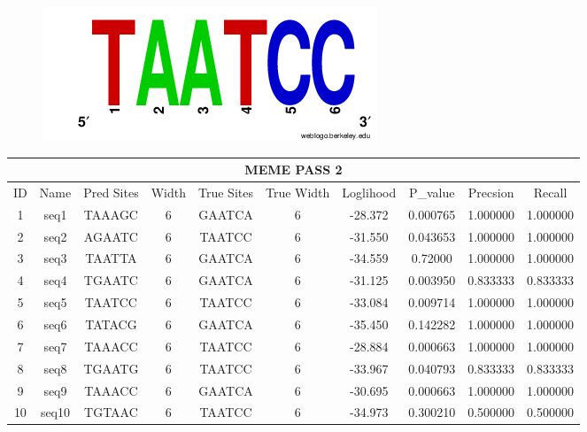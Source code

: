 \documentclass{article}
\begin{document}
\begin{table}
\begin{tabular}{cccccccccc}
\bottomrule
\end{tabular}
\begin{figure}[H]
\centering
\includegraphics[scale=0.25]{test1.png}
\label{fig:svd}
\end{figure}
\centering
\begin{tabular}{cccccccccc}
  \multicolumn{10}{|c|}{\textbf{MEME PASS 2}}\\
   \hline
\toprule
 ID &   Name & Pred Sites & Width & True Sites & True Width &  Loglihood &   P\_value &  Precsion &    Recall \\
\midrule
  1 &   seq1 &     TAAAGC &     6 &     GAATCA &          6 &    -28.372 &  0.000765 &  1.000000 &  1.000000 \\
  2 &   seq2 &     AGAATC &     6 &     TAATCC &          6 &    -31.550 &  0.043653 &  1.000000 &  1.000000 \\
  3 &   seq3 &     TAATTA &     6 &     GAATCA &          6 &    -34.559 &  0.72000 &  1.000000 &  1.000000 \\
  4 &   seq4 &     TGAATC &     6 &     GAATCA &          6 &    -31.125 &  0.003950 &  0.833333 &  0.833333 \\
  5 &   seq5 &     TAATCC &     6 &     TAATCC &          6 &    -33.084 &  0.009714 &  1.000000 &  1.000000 \\
  6 &   seq6 &     TATACG &     6 &     GAATCA &          6 &    -35.450 &  0.142282 &  1.000000 &  1.000000 \\
  7 &   seq7 &     TAAACC &     6 &     TAATCC &          6 &    -28.884 &  0.000663 &  1.000000 &  1.000000 \\
  8 &   seq8 &     TGAATG &     6 &     TAATCC &          6 &    -33.967 &  0.040793 &  0.833333 &  0.833333 \\
  9 &   seq9 &     TAAACC &     6 &     GAATCA &          6 &    -30.695 &  0.000663 &  1.000000 &  1.000000 \\
 10 &  seq10 &     TGTAAC &     6 &     TAATCC &          6 &    -34.973 &  0.300210 &  0.500000 &  0.500000 \\
 

\end{tabular}
\end{table}
\end{document}

